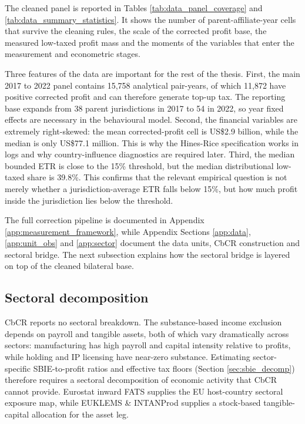 \documentclass[11pt,a4paper]{article}
\begin{document}
The cleaned panel is reported in Tables \ref{tab:data_panel_coverage} and \ref{tab:data_summary_statistics}. It shows the number of parent-affiliate-year cells that survive the cleaning rules, the scale of the corrected profit base, the measured low-taxed profit mass and the moments of the variables that enter the measurement and econometric stages.



Three features of the data are important for the rest of the thesis. First, the main 2017 to 2022 panel contains 15{,}758 analytical pair-years, of which 11{,}872 have positive corrected profit and can therefore generate top-up tax. The reporting base expands from 38 parent jurisdictions in 2017 to 54 in 2022, so year fixed effects are necessary in the behavioural model. Second, the financial variables are extremely right-skewed: the mean corrected-profit cell is US\$2.9 billion, while the median is only US\$77.1 million. This is why the Hines-Rice specification works in logs and why country-influence diagnostics are required later. Third, the median bounded ETR is close to the 15\% threshold, but the median distributional low-taxed share is 39.8\%. This confirms that the relevant empirical question is not merely whether a jurisdiction-average ETR falls below 15\%, but how much profit inside the jurisdiction lies below the threshold.

The full correction pipeline is documented in Appendix \ref{app:measurement_framework}, while Appendix Sections \ref{app:data}, \ref{app:unit_obs} and \ref{app:sector} document the data units, CbCR construction and sectoral bridge. The next subsection explains how the sectoral bridge is layered on top of the cleaned bilateral base.

\subsection{Sectoral decomposition}\label{sec:sectoral_data}

CbCR reports no sectoral breakdown. The substance-based income exclusion depends on payroll and tangible assets, both of which vary dramatically across sectors: manufacturing has high payroll and capital intensity relative to profits, while holding and IP licensing have near-zero substance. Estimating sector-specific SBIE-to-profit ratios and effective tax floors (Section \ref{sec:sbie_decomp}) therefore requires a sectoral decomposition of economic activity that CbCR cannot provide. Eurostat inward FATS supplies the EU host-country sectoral exposure map, while EUKLEMS \& INTANProd supplies a stock-based tangible-capital allocation for the asset leg.
\end{document}
